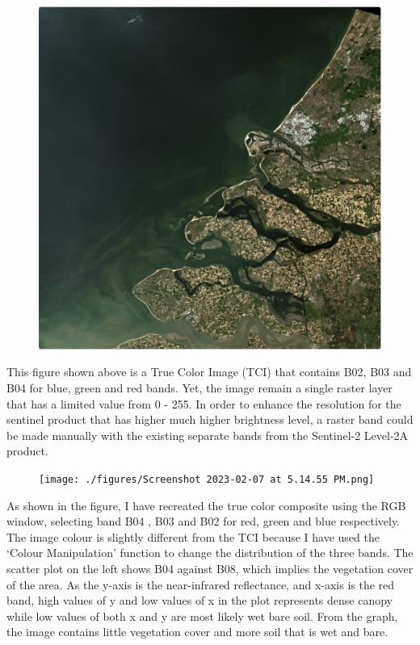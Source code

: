 \documentclass[
  letterpaper,
  DIV=11,
  numbers=noendperiod]{scrreprt}
\begin{document}
\begin{figure}

{\centering \includegraphics[width=1\textwidth,height=\textheight]{./figures/Screenshot 2023-02-08 at 4.13.36 PM.png}

}

\end{figure}

This figure shown above is a True Color Image (TCI) that contains B02,
B03 and B04 for blue, green and red bands. Yet, the image remain a
single raster layer that has a limited value from 0 - 255. In order to
enhance the resolution for the sentinel product that has higher much
higher brightness level, a raster band could be made manually with the
existing separate bands from the Sentinel-2 Level-2A product.

\begin{figure}

{\centering \texttt{[image: ./figures/Screenshot 2023-02-07 at 5.14.55 PM.png]}

}

\end{figure}

As shown in the figure, I have recreated the true color composite using
the RGB window, selecting band B04 , B03 and B02 for red, green and blue
respectively. The image colour is slightly different from the TCI
because I have used the `Colour Manipulation' function to change the
distribution of the three bands. The scatter plot on the left shows B04
against B08, which implies the vegetation cover of the area. As the
y-axis is the near-infrared reflectance, and x-axis is the red band,
high values of y and low values of x in the plot represents dense canopy
while low values of both x and y are most likely wet bare soil. From the
graph, the image contains little vegetation cover and more soil that is
wet and bare.
\end{document}
